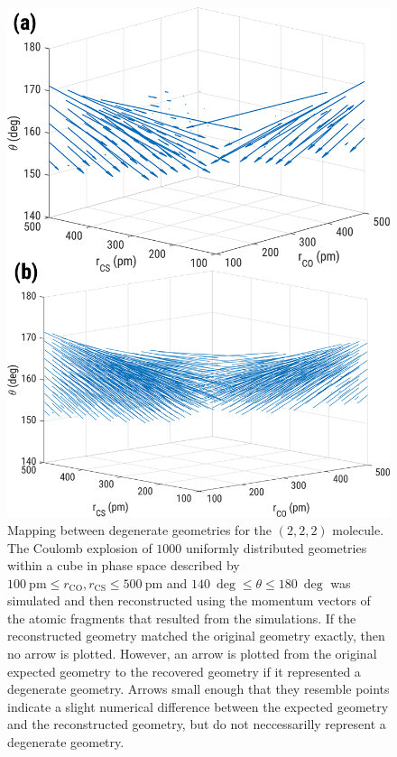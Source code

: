 \begin{figure}
  \centering
  \includegraphics[width=\textwidth]{Plots/OCS222DegeneracyMap}
  \caption[Mapping between degenerate geometries for the  $(2,2,2)$ molecule.]
  {Mapping between degenerate geometries for the  $(2,2,2)$ molecule. The Coulomb explosion of $1000$ uniformly distributed geometries within a cube in phase space described by $\SI{100}{\pico\meter} \le r_\mathrm{CO}, r_\mathrm{CS} \le \SI{500}{\pico\meter}$ and $\SI{140}{\deg} \le \theta \le \SI{180}{\deg}$ was simulated and then reconstructed using the momentum vectors of the atomic fragments that resulted from the simulations. If the reconstructed geometry matched the original geometry exactly, then no arrow is plotted. However, an arrow is plotted from the original expected geometry to the recovered geometry if it represented a degenerate geometry. Arrows small enough that they resemble points indicate a slight numerical difference between the expected geometry and the reconstructed geometry, but do not neccessarilly represent a degenerate geometry.}
  \label{fig:OCS222DegeneracyMapSD}
\end{figure}


